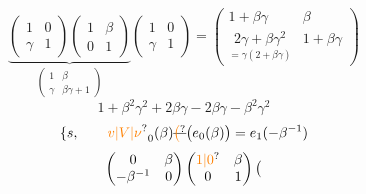 \margin{$ {\rho'}^3=\begin{pmatrix}-1&-1\\1&0\end{pmatrix}\begin{pmatrix}0&1\\-1&-1\end{pmatrix}=\left(\begin{matrix}1&0\\0&2\end{matrix}\right]$}
\[\underbrace{\begin{pmatrix}1&0\\\gamma&1\end{pmatrix}\begin{pmatrix}1&\beta\\0&1\end{pmatrix}}_{\begin{pmatrix}1&\beta\\\gamma&\beta\gamma+1\end{pmatrix}}\begin{pmatrix}1&0\\\gamma&1\end{pmatrix}=\begin{pmatrix}1+\beta\gamma&\beta\\\underset{=\gamma(2+\beta\gamma)}{2\gamma+\beta\gamma^2}&1+\beta\gamma\end{pmatrix}\]
\[1+\beta^2\gamma^2+2\beta\gamma-2\beta\gamma-\beta^2\gamma^2\]
\[\{s,\qquad \unsure{v|V|\nu}_0(\beta)\deleted{\unsure{\bigl(}}\big(e_0(\beta)\big)=e_1(-\beta^{-1})\]
\[\begin{pmatrix}0&\beta\\-\beta^{-1}&0\end{pmatrix}\begin{pmatrix}\unsure{1|0}&\beta\\0&1\end{pmatrix}\bigl(\]
